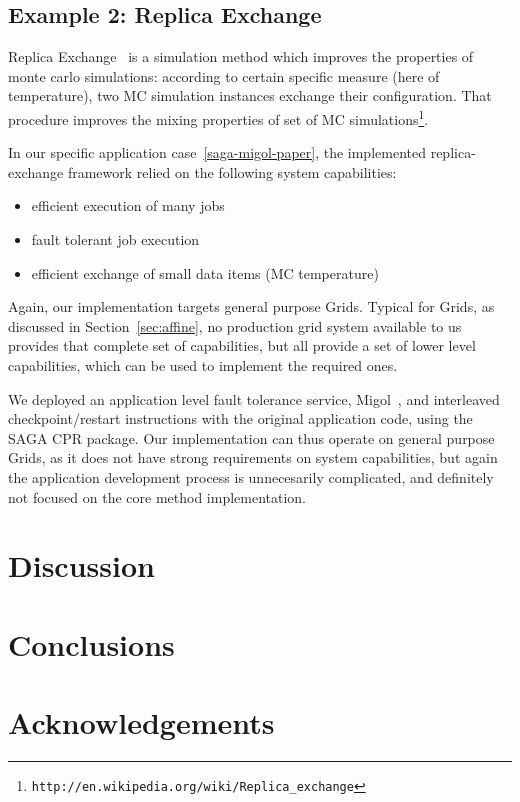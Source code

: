 \documentclass{article}
\newenvironment{shortlist}{
  \vspace*{-0.5em}
  \begin{itemize}
  \setlength{\itemsep}{-0.3em}
}{
  \end{itemize}
  \vspace*{-0.5em}
}
\newcommand{\T}[1]{\texttt{#1}}
\begin{document}
 \subsection{Example 2: Replica Exchange}

  Replica Exchange~\cite{repex} is a simulation method which
  improves the properties of monte carlo simulations:  according
  to certain specific measure (here of temperature), two MC
  simulation instances exchange their configuration.  That
  procedure improves the mixing properties of set of MC
  simulations\footnote{\T{http://en.wikipedia.org/wiki/Replica\_exchange}}.

  In our specific application case~\ref{saga-migol-paper}, the
  implemented replica-exchange framework relied on the following
  system capabilities: 

  \begin{shortlist}
   \item efficient execution of many jobs
   \item fault tolerant job execution
   \item efficient exchange of small data items (MC temperature)
  \end{shortlist}

  Again, our implementation targets general purpose Grids.
  Typical for Grids, as discussed in Section~\ref{sec:affine},
  no production grid system available to us provides that
  complete set of capabilities, but all provide a set of lower
  level capabilities, which can be used to implement the
  required ones.

  We deployed an application level fault tolerance service,
  Migol~\cite{migol}, and interleaved checkpoint/restart
  instructions with the original application code, using the
  SAGA CPR package.  Our implementation can thus operate on
  general purpose Grids, as it does not have strong requirements
  on system capabilities, but again the application development
  process is unnecesarily complicated, and definitely not
  focused on the core method implementation.



\section{Discussion}
\label{sec:discussion}


\section{Conclusions}
\label{sec:conclusion}

\section{Acknowledgements}
\label{sec:acks}



\end{document}
